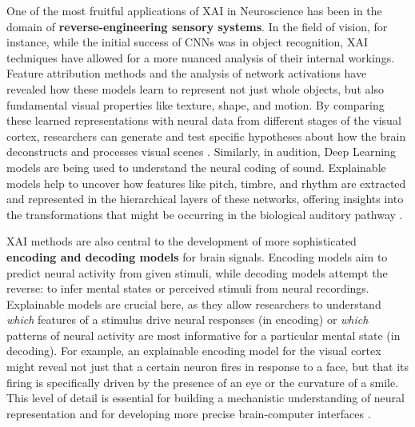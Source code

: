 One of the most fruitful applications of XAI in Neuroscience has been in the domain of \textbf{reverse-engineering sensory systems}. In the field of vision, for instance, while the initial success of CNNs was in object recognition, XAI techniques have allowed for a more nuanced analysis of their internal workings. Feature attribution methods and the analysis of network activations have revealed how these models learn to represent not just whole objects, but also fundamental visual properties like texture, shape, and motion. By comparing these learned representations with neural data from different stages of the visual cortex, researchers can generate and test specific hypotheses about how the brain deconstructs and processes visual scenes \cite{yamins2016using, kriegeskorte2018cognitive}. Similarly, in audition, Deep Learning models are being used to understand the neural coding of sound. Explainable models help to uncover how features like pitch, timbre, and rhythm are extracted and represented in the hierarchical layers of these networks, offering insights into the transformations that might be occurring in the biological auditory pathway \cite{richards2019deep}.

XAI methods are also central to the development of more sophisticated \textbf{encoding and decoding models} for brain signals. Encoding models aim to predict neural activity from given stimuli, while decoding models attempt the reverse: to infer mental states or perceived stimuli from neural recordings. Explainable models are crucial here, as they allow researchers to understand \textit{which} features of a stimulus drive neural responses (in encoding) or \textit{which} patterns of neural activity are most informative for a particular mental state (in decoding). For example, an explainable encoding model for the visual cortex might reveal not just that a certain neuron fires in response to a face, but that its firing is specifically driven by the presence of an eye or the curvature of a smile. This level of detail is essential for building a mechanistic understanding of neural representation and for developing more precise brain-computer interfaces \cite{schrimpf2020brain}.

